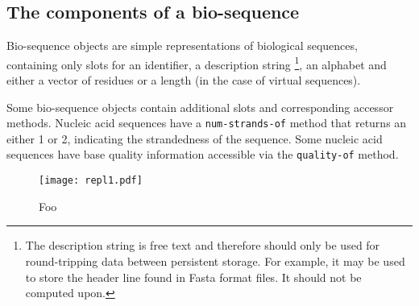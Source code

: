 \documentclass[a4paper, 12pt]{article}
\begin{document}
\subsection{The components of a bio-sequence}
\label{sec:component-bioseq}

Bio-sequence objects are simple representations of biological
sequences, containing only slots for an identifier, a description
string \footnote{The description string is free text and therefore
  should only be used for round-tripping data between persistent
  storage. For example, it may be used to store the header line found
  in Fasta format files. It should not be computed upon.}, an alphabet
and either a vector of residues or a length (in the case of virtual
sequences).

Some bio-sequence objects contain additional slots and corresponding
accessor methods. Nucleic acid sequences have a
\lstinline!num-strands-of! method that returns an either 1 or 2,
indicating the strandedness of the sequence. Some nucleic acid
sequences have base quality information accessible via the
\lstinline!quality-of! method.





\begin{figure}[1]
  \texttt{[image: repl1.pdf]}
  \caption{Foo}
  \label{fig:repl1}
\end{figure}
\end{document}
